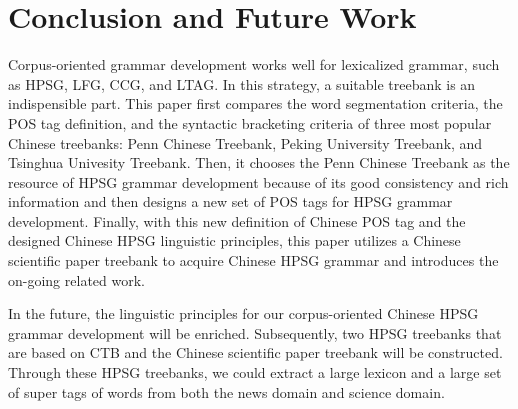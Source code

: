 \documentclass[english]{jnlp_1.4}
\begin{document}
\section{Conclusion and Future Work}

Corpus-oriented grammar development works well for lexicalized grammar, such 
as HPSG, LFG, CCG, and LTAG. In this strategy, a suitable treebank is an 
indispensible part. This paper first compares the word segmentation 
criteria, the POS tag definition, and the syntactic bracketing criteria of 
three most popular Chinese treebanks: Penn Chinese Treebank, Peking 
University Treebank, and Tsinghua Univesity Treebank. Then, it chooses the 
Penn Chinese Treebank as the resource of HPSG grammar development because of 
its good consistency and rich information and then designs a new set of POS 
tags for HPSG grammar development. Finally, with this new definition of 
Chinese POS tag and the designed Chinese HPSG linguistic principles, this 
paper utilizes a Chinese scientific paper treebank to acquire Chinese HPSG 
grammar and introduces the on-going related work.

In the future, the linguistic principles for our corpus-oriented Chinese 
HPSG grammar development will be enriched. Subsequently, two HPSG treebanks 
that are based on CTB and the Chinese scientific paper treebank will be 
constructed. Through these HPSG treebanks, we could extract a large lexicon 
and a large set of super tags of words from both the news domain and science 
domain.
\end{document}
